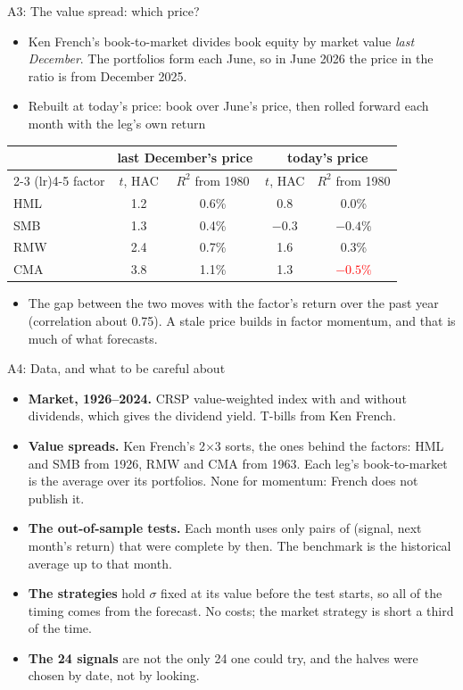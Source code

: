 \documentclass[aspectratio=169,10pt]{beamer}
\begin{document}
\begin{frame}[label=appendix_vs]{A3: The value spread: which price?}
\begin{itemize}
\item Ken French's book-to-market divides book equity by market value \emph{last December}. The portfolios form each June, so in June 2026 the price in the ratio is from December 2025.
\vskip 4pt
\item Rebuilt at today's price: book over June's price, then rolled forward each month with the leg's own return
\end{itemize}
\vskip 2pt
\begin{center}
\renewcommand{\arraystretch}{1.2}
\begin{tabular}{lcccc}
\toprule
 & \multicolumn{2}{c}{last December's price} & \multicolumn{2}{c}{today's price} \\
\cmidrule(lr){2-3} \cmidrule(lr){4-5}
factor & $t$, HAC & $R^{2}$ from 1980 & $t$, HAC & $R^{2}$ from 1980 \\
\midrule
HML & 1.2 & 0.6\% & 0.8 & 0.0\% \\
SMB & 1.3 & 0.4\% & $-0.3$ & $-0.4\%$ \\
RMW & 2.4 & 0.7\% & 1.6 & 0.3\% \\
CMA & 3.8 & 1.1\% & 1.3 & \textcolor{red}{$-0.5\%$} \\
\bottomrule
\end{tabular}
\end{center}
\vskip 2pt
\begin{itemize}
\item The gap between the two moves with the factor's return over the past year (correlation about 0.75). A stale price builds in factor momentum, and that is much of what forecasts.
\end{itemize}
\hfill \hyperlink{vstable}{}
\end{frame}

\begin{frame}{A4: Data, and what to be careful about}
\begin{itemize}
\item \textbf{Market, 1926--2024.} CRSP value-weighted index with and without dividends, which gives the dividend yield. T-bills from Ken French.
\vskip 5pt
\item \textbf{Value spreads.} Ken French's 2$\times$3 sorts, the ones behind the factors: HML and SMB from 1926, RMW and CMA from 1963. Each leg's book-to-market is the average over its portfolios. None for momentum: French does not publish it.
\vskip 5pt
\item \textbf{The out-of-sample tests.} Each month uses only pairs of (signal, next month's return) that were complete by then. The benchmark is the historical average up to that month.
\vskip 5pt
\item \textbf{The strategies} hold $\sigma$ fixed at its value before the test starts, so all of the timing comes from the forecast. No costs; the market strategy is short a third of the time.
\vskip 5pt
\item \textbf{The 24 signals} are not the only 24 one could try, and the halves were chosen by date, not by looking.
\end{itemize}
\end{frame}
\end{document}
